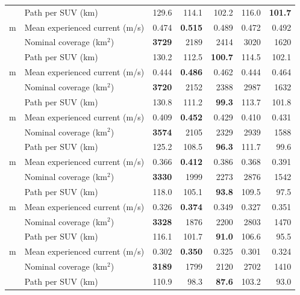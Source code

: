 \begin{center}
\begin{tabular*}{\textwidth}{@{\extracolsep{\fill}}llrrrrr@{}}
 & Path per SUV (km) & 129.6 & 114.1 & 102.2 & 116.0 & \textbf{101.7} \\
\addlinespace[1.5pt]
10 m & Mean experienced current (m/s) & 0.474 & \textbf{0.515} & 0.489 & 0.472 & 0.492 \\
 & Nominal coverage (km$^2$) & \textbf{3729} & 2189 & 2414 & 3020 & 1620 \\
 & Path per SUV (km) & 130.2 & 112.5 & \textbf{100.7} & 114.5 & 102.1 \\
\addlinespace[1.5pt]
20 m & Mean experienced current (m/s) & 0.444 & \textbf{0.486} & 0.462 & 0.444 & 0.464 \\
 & Nominal coverage (km$^2$) & \textbf{3720} & 2152 & 2388 & 2987 & 1632 \\
 & Path per SUV (km) & 130.8 & 111.2 & \textbf{99.3} & 113.7 & 101.8 \\
\addlinespace[1.5pt]
30 m & Mean experienced current (m/s) & 0.409 & \textbf{0.452} & 0.429 & 0.410 & 0.431 \\
 & Nominal coverage (km$^2$) & \textbf{3574} & 2105 & 2329 & 2939 & 1588 \\
 & Path per SUV (km) & 125.2 & 108.5 & \textbf{96.3} & 111.7 & 99.6 \\
\addlinespace[1.5pt]
40 m & Mean experienced current (m/s) & 0.366 & \textbf{0.412} & 0.386 & 0.368 & 0.391 \\
 & Nominal coverage (km$^2$) & \textbf{3330} & 1999 & 2273 & 2876 & 1542 \\
 & Path per SUV (km) & 118.0 & 105.1 & \textbf{93.8} & 109.5 & 97.5 \\
\addlinespace[1.5pt]
50 m & Mean experienced current (m/s) & 0.326 & \textbf{0.374} & 0.349 & 0.327 & 0.351 \\
 & Nominal coverage (km$^2$) & \textbf{3328} & 1876 & 2200 & 2803 & 1470 \\
 & Path per SUV (km) & 116.1 & 101.7 & \textbf{91.0} & 106.6 & 95.5 \\
\addlinespace[1.5pt]
60 m & Mean experienced current (m/s) & 0.302 & \textbf{0.350} & 0.325 & 0.301 & 0.324 \\
 & Nominal coverage (km$^2$) & \textbf{3189} & 1799 & 2120 & 2702 & 1410 \\
 & Path per SUV (km) & 110.9 & 98.3 & \textbf{87.6} & 103.2 & 93.0 \\
\bottomrule
\end{tabular*}
\end{center}
